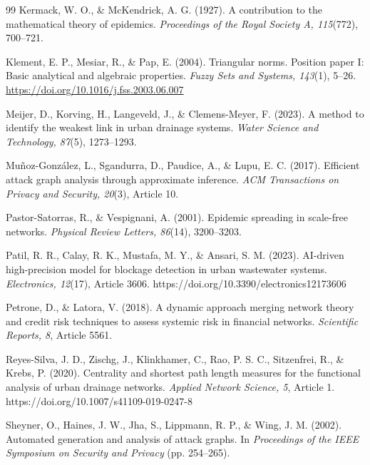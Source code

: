 \begin{thebibliography}{99}
Kermack, W. O., \& McKendrick, A. G. (1927). A contribution to the mathematical theory of epidemics. \textit{Proceedings of the Royal Society A, 115}(772), 700--721.

Klement, E. P., Mesiar, R., \& Pap, E. (2004). Triangular norms. Position paper I: Basic analytical and algebraic properties. \textit{Fuzzy Sets and Systems, 143}(1), 5--26. \url{https://doi.org/10.1016/j.fss.2003.06.007}

Meijer, D., Korving, H., Langeveld, J., \& Clemens-Meyer, F. (2023). A method to identify the weakest link in urban drainage systems. \textit{Water Science and Technology, 87}(5), 1273--1293.

Mu\~noz-Gonz\'alez, L., Sgandurra, D., Paudice, A., \& Lupu, E. C. (2017). Efficient attack graph analysis through approximate inference. \textit{ACM Transactions on Privacy and Security, 20}(3), Article 10.

Pastor-Satorras, R., \& Vespignani, A. (2001). Epidemic spreading in scale-free networks. \textit{Physical Review Letters, 86}(14), 3200--3203.

Patil, R. R., Calay, R. K., Mustafa, M. Y., \& Ansari, S. M. (2023). AI-driven high-precision model for blockage detection in urban wastewater systems. \textit{Electronics, 12}(17), Article 3606. https://doi.org/10.3390/electronics12173606

Petrone, D., \& Latora, V. (2018). A dynamic approach merging network theory and credit risk techniques to assess systemic risk in financial networks. \textit{Scientific Reports, 8}, Article 5561.

Reyes-Silva, J. D., Zischg, J., Klinkhamer, C., Rao, P. S. C., Sitzenfrei, R., \& Krebs, P. (2020). Centrality and shortest path length measures for the functional analysis of urban drainage networks. \textit{Applied Network Science, 5}, Article 1. https://doi.org/10.1007/s41109-019-0247-8

Sheyner, O., Haines, J. W., Jha, S., Lippmann, R. P., \& Wing, J. M. (2002). Automated generation and analysis of attack graphs. In \textit{Proceedings of the IEEE Symposium on Security and Privacy} (pp. 254--265).


\end{thebibliography}

